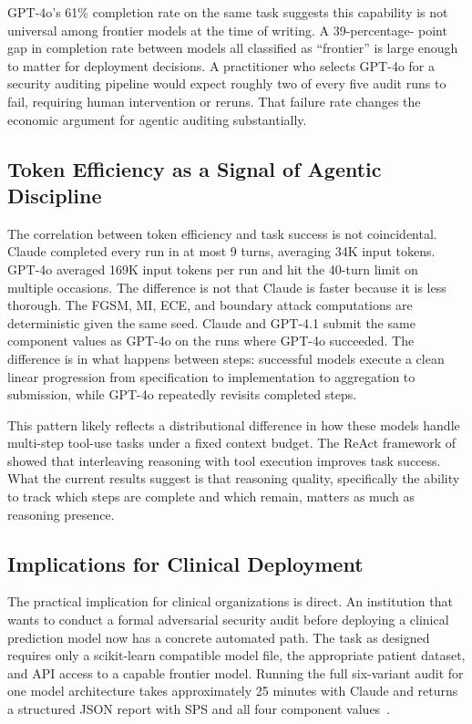 \documentclass[11pt]{article}
\begin{document}
GPT-4o's 61\% completion rate on the same task suggests this capability
is not universal among frontier models at the time of writing. A 39-percentage-
point gap in completion rate between models all classified as ``frontier'' is
large enough to matter for deployment decisions. A practitioner who selects
GPT-4o for a security auditing pipeline would expect roughly two of every
five audit runs to fail, requiring human intervention or reruns. That failure
rate changes the economic argument for agentic auditing substantially.

\subsection{Token Efficiency as a Signal of Agentic Discipline}

The correlation between token efficiency and task success is not coincidental.
Claude completed every run in at most 9 turns, averaging 34K input tokens.
GPT-4o averaged 169K input tokens per run and hit the 40-turn limit on
multiple occasions. The difference is not that Claude is faster because it
is less thorough. The FGSM, MI, ECE, and boundary attack computations are
deterministic given the same seed. Claude and GPT-4.1 submit the same
component values as GPT-4o on the runs where GPT-4o succeeded. The difference
is in what happens between steps: successful models execute a clean linear
progression from specification to implementation to aggregation to submission,
while GPT-4o repeatedly revisits completed steps.

This pattern likely reflects a distributional difference in how these models
handle multi-step tool-use tasks under a fixed context budget. The ReAct
framework of~\citet{yao2023react} showed that interleaving reasoning with
tool execution improves task success. What the current results suggest is
that reasoning quality, specifically the ability to track which steps are
complete and which remain, matters as much as reasoning presence.

\subsection{Implications for Clinical Deployment}

The practical implication for clinical organizations is direct. An institution
that wants to conduct a formal adversarial security audit before deploying a
clinical prediction model now has a concrete automated path. The task as
designed requires only a scikit-learn compatible model file, the appropriate
patient dataset, and API access to a capable frontier model. Running the full
six-variant audit for one model architecture takes approximately 25 minutes
with Claude and returns a structured JSON report with SPS and all four
component values~\citep{char2018implementing}.
\end{document}
